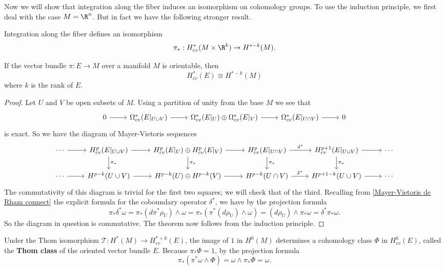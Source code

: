 Now we will show that integration along the fiber induces an isomorphism on cohomology groups. To use the induction principle, we first deal with the case $M=\R^n$. But 
in fact we have the following stronger result.
\begin{proposition}
Integration along the fiber defines an isomorphism
\[\pi_*:H^*_{cv}(M\times\R^k)\to H^{*-k}(M).\]
\end{proposition}
\begin{theorem}\label{Thom iso}
If the vector bundle $\pi:E\to M$ over a manifold $M$ is orientable, then
\[H^*_{cv}(E)\cong H^{*-k}(M)\]
where $k$ is the rank of $E$.
\end{theorem}
\begin{proof}
Let $U$ and $V$ be open subsets of $M$. Using a partition of unity from the base $M$ we see that
\[\begin{tikzcd}
0\ar[r]&\Omega^*_{cv}(E|_{U\cup V})\ar[r]&\Omega^*_{cv}(E|_{U})\oplus\Omega^*_{cv}(E|_{V})\ar[r]&\Omega^*_{cv}(E|_{U\cap V})\ar[r]&0
\end{tikzcd}\]
is exact. So we have the diagram of Mayer-Vietoris sequences
\[\begin{tikzcd}[scale=0.75]
\cdots\ar[r]&H^p_{cv}(E|_{U\cup V})\ar[r]\ar[d,"\pi_*"]&H^p_{cv}(E|_{U})\oplus H^p_{cv}(E|_{V})\ar[r]\ar[d,"\pi_*"]&H^p_{cv}(E|_{U\cap V})\ar[r,"\delta^*"]\ar[d,"\pi_*"]&H^{p+1}_{cv}(E|_{U\cup V})\ar[r]\ar[d,"\pi_*"]&\cdots\\
\cdots\ar[r]&H^{p-k}(U\cup V)\ar[r]&H^{p-k}(U)\oplus H^{p-k}(V)\ar[r]&H^{p-k}(U\cap V)\ar[r,"\delta^*"]&H^{p+1-k}(U\cup V)\ar[r]&\cdots
\end{tikzcd}\]
The commutativity of this diagram is trivial for the first two squares; we will check that of the third. Recalling from \cref{Mayer-Vietoris de Rham connect} 
the explicit formula for the coboundary operator $\delta^*$, we have by the projection formula
\[\pi_*\delta^*\omega=\pi_*(d\pi^*\rho_U)\wedge\omega=\pi_*(\pi^*(d\rho_U)\wedge\omega)=(d\rho_U)\wedge\pi_*\omega=\delta^*\pi_*\omega.\]
So the diagram in question is commutative. The theorem now follows from the induction principle.
\end{proof}
Under the Thom isomorphism $\mathscr{T}:H^*(M)\to H^{*+k}_{cv}(E)$, the image of $1$ in $H^0(M)$ determines a cohomology class $\Phi$ in $H^k_{cv}(E)$, called the 
\textbf{Thom class} of the oriented vector bundle $E$. Because $\pi_*\Phi=1$, by the projection formula
\[\pi_*(\pi^*\omega\wedge\Phi)=\omega\wedge\pi_*\Phi=\omega.\]

